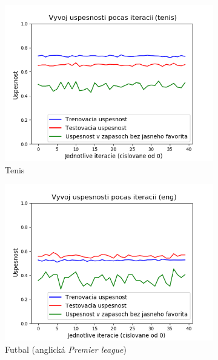 \begin{figure}[h!] 
  \begin{subfigure}[b]{0.48\linewidth}
    \includegraphics[width=\linewidth]{../img/rnn_tenis_res.png} 
    \caption{Tenis} 
  \end{subfigure} 
  \begin{subfigure}[b]{0.48\linewidth}
    \includegraphics[width=\linewidth]{../img/rnn_eng_res.png} 
    \caption{Futbal (anglická \textit{Premier league})} 
  \end{subfigure} 
  \begin{subfigure}[b]{0.48\linewidth}

\end{subfigure}
\end{figure}
